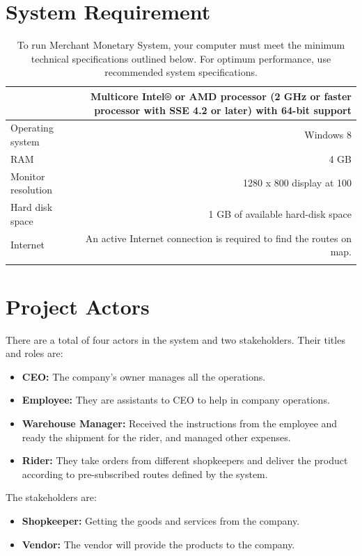 \documentclass[12pt,a4paper]{article}
\begin{document}
\section*{System Requirement}
\begin{longtable}{lr} 
 \caption{To run Merchant Monetary System, your computer must meet the minimum technical specifications outlined below. For optimum performance, use recommended system specifications.}\\
\begin{tabular}{ | m{4cm} | m{12cm}| } \hline
Processor & 
Multicore Intel® or AMD processor (2 GHz or faster processor with SSE 4.2 or later) with 64-bit support
 \\ \hline
Operating system & Windows 8
 \\ \hline
RAM & 4 GB
 \\ \hline
Monitor resolution & 1280 x 800 display at 100%
 \\ \hline
Hard disk space & 1 GB of available hard-disk space
 \\ \hline
Internet & 
An active Internet connection is required to find the routes on  map. 
  \\ \hline
\end{tabular}
\end{longtable}
\section{Project Actors}
There are a total of four actors in the system and two stakeholders. Their titles and roles are:
\begin{itemize}
\item \textbf{ CEO:} The company's owner manages all the operations.
\item \textbf{Employee:} They are assistants to CEO to help in company operations. 
\item \textbf{Warehouse Manager:} Received the instructions from the employee and ready the shipment for the rider, and managed other expenses.
\item \textbf{Rider:} They take orders from different shopkeepers and deliver the product according to pre-subscribed routes defined by the system.
\end{itemize}
The stakeholders are:
\begin{itemize}
\item \textbf{Shopkeeper:} Getting the goods and services from the company.
\item \textbf{Vendor:} The vendor will provide the products to the company. 
\end{itemize}
\end{document}
